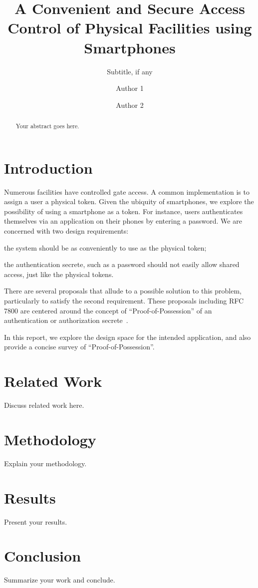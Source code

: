 \documentclass[sigconf]{acmart}
\begin{document}
\title{A Convenient and Secure Access Control of Physical Facilities using Smartphones}
\subtitle{Subtitle, if any}

\author{Author 1}

\author{Author 2}

\begin{abstract}
Your abstract goes here.
\end{abstract}


\maketitle

\section{Introduction}
Numerous facilities have controlled gate access. A common implementation is to
assign a user a physical token. Given the ubiquity of smartphones, we explore
the possibility of using a smartphone as a token. For instance, users
authenticates themselves via an application on their phones by entering a
password. We are concerned with two design requirements:
\begin{inparaenum}[1)] \item the system should be as conveniently to use as the
physical token;
    \item the authentication secrete, such as a password should not easily allow
shared access, just like the physical tokens. \end{inparaenum}

There are several proposals that allude to a possible solution to this problem,
particularly to satisfy the second requirement. These proposals including RFC
7800 are centered around the concept of ``Proof-of-Possession'' of an
authentication or authorization secrete~\cite{RFC7800,
I-D.ietf-oauth-pop-architecture, I-D.ietf-oauth-pop-key-distribution}.

In this report, we explore the design space for the intended application, and also 
provide a concise survey of ``Proof-of-Possession''. 



\section{Related Work}
Discuss related work here.

\section{Methodology}
Explain your methodology.

\section{Results}
Present your results.

\section{Conclusion}
Summarize your work and conclude.



\end{document}

